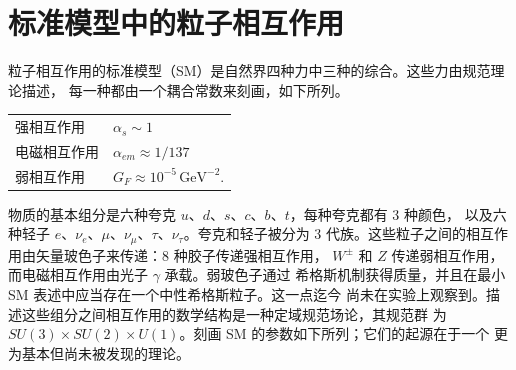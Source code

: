 
\chapter{标准模型中的粒子相互作用}

粒子相互作用的标准模型（SM）是自然界四种力中三种的综合。这些力由规范理论描述，
每一种都由一个耦合常数来刻画，如下所列。

\begin{center}
\begin{tabular}{ll}
强相互作用 & $\alpha_s \sim 1$ \\
电磁相互作用 & $\alpha_{em} \approx 1/137$ \\
弱相互作用 & $G_F \approx 10^{-5}\,\mathrm{GeV}^{-2}$.
\end{tabular}
\end{center}

物质的基本组分是六种夸克 $u$、$d$、$s$、$c$、$b$、$t$，每种夸克都有 3 种颜色，
以及六种轻子 $e$、$\nu_e$、$\mu$、$\nu_\mu$、$\tau$、$\nu_\tau$。夸克和轻子被分为
3 代族。这些粒子之间的相互作用由矢量玻色子来传递：8 种胶子传递强相互作用，
$W^\pm$ 和 $Z$ 传递弱相互作用，而电磁相互作用由光子 $\gamma$ 承载。弱玻色子通过
希格斯机制获得质量，并且在最小 SM 表述中应当存在一个中性希格斯粒子。这一点迄今
尚未在实验上观察到。描述这些组分之间相互作用的数学结构是一种定域规范场论，其规范群
为 $SU(3) \times SU(2) \times U(1)$。刻画 SM 的参数如下所列；它们的起源在于一个
更为基本但尚未被发现的理论。

